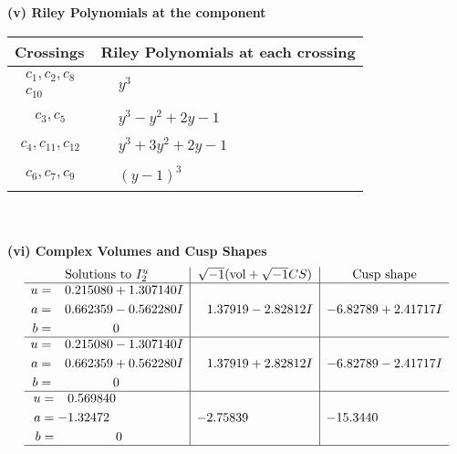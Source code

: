 \documentclass[1p]{elsarticle_modified}
\theoremstyle{definition}
\newcommand{\I}{\sqrt{-1}}
\begin{document}
\newpage\renewcommand{\arraystretch}{1}
\flushleft \textbf{(v) Riley Polynomials at the component}\newline \\
\begin{tabular}{m{50pt}|m{274pt}}
Crossings & \hspace{64pt}Riley Polynomials at each crossing \\
\hline $$\begin{aligned}c_{1},c_{2},c_{8}\\c_{10}\end{aligned}$$&$\begin{aligned}
&y^3
\end{aligned}$\\
\hline $$\begin{aligned}c_{3},c_{5}\end{aligned}$$&$\begin{aligned}
&y^3- y^2+2 y-1
\end{aligned}$\\
\hline $$\begin{aligned}c_{4},c_{11},c_{12}\end{aligned}$$&$\begin{aligned}
&y^3+3 y^2+2 y-1
\end{aligned}$\\
\hline $$\begin{aligned}c_{6},c_{7},c_{9}\end{aligned}$$&$\begin{aligned}
&(y-1)^3
\end{aligned}$\\
\hline
\end{tabular}\\~\\
\newpage\flushleft \textbf{(vi) Complex Volumes and Cusp Shapes}
$$\begin{array}{c|c|c}  
\text{Solutions to }I^u_{2}& \I (\text{vol} + \sqrt{-1}CS) & \text{Cusp shape}\\
 \hline 
\begin{aligned}
u &= \phantom{-}0.215080 + 1.307140 I \\
a &= \phantom{-}0.662359 - 0.562280 I \\
b &= \phantom{-0.000000 } 0\end{aligned}
 & \phantom{-}1.37919 - 2.82812 I & -6.82789 + 2.41717 I \\ \hline\begin{aligned}
u &= \phantom{-}0.215080 - 1.307140 I \\
a &= \phantom{-}0.662359 + 0.562280 I \\
b &= \phantom{-0.000000 } 0\end{aligned}
 & \phantom{-}1.37919 + 2.82812 I & -6.82789 - 2.41717 I \\ \hline\begin{aligned}
u &= \phantom{-}0.569840\phantom{ +0.000000I} \\
a &= -1.32472\phantom{ +0.000000I} \\
b &= \phantom{-0.000000 } 0\end{aligned}
 & -2.75839\phantom{ +0.000000I} & -15.3440\phantom{ +0.000000I}\\
 \hline 
 \end{array}$$\newpage
\end{document}
